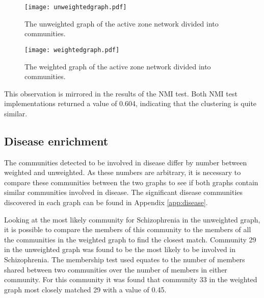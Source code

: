 \begin{figure}
    \centering
    \texttt{[image: unweightedgraph.pdf]}
    \caption{The unweighted graph of the active zone network divided into communities.}
    \label{fig:uwgraph}
\end{figure}

\begin{figure}
    \centering
    \texttt{[image: weightedgraph.pdf]}
    \caption{The weighted graph of the active zone network divided into communities.}
    \label{fig:wgraph}
\end{figure}


This observation is mirrored in the results of the NMI test.
Both NMI test implementations returned a value of 0.604, indicating that the clustering is quite similar.

\subsection{Disease enrichment}
The communities detected to be involved in disease differ by number between weighted and unweighted.
As these numbers are arbitrary, it is necessary to compare these communities between the two graphs to see if both graphs contain similar communities involved in disease.
The significant disease communities discovered in each graph can be found in Appendix \ref{app:disease}.

Looking at the most likely community for Schizophrenia in the unweighted graph, it is possible to compare the members of this community to the members of all the communities in the weighted graph to find the closest match.
Community 29 in the unweighted graph was found to be the most likely to be involved in Schizophrenia.
The membership test used equates to the number of members shared between two communities over the number of members in either community.
For this community it was found that community 33 in the weighted graph most closely matched 29 with a value of 0.45.

